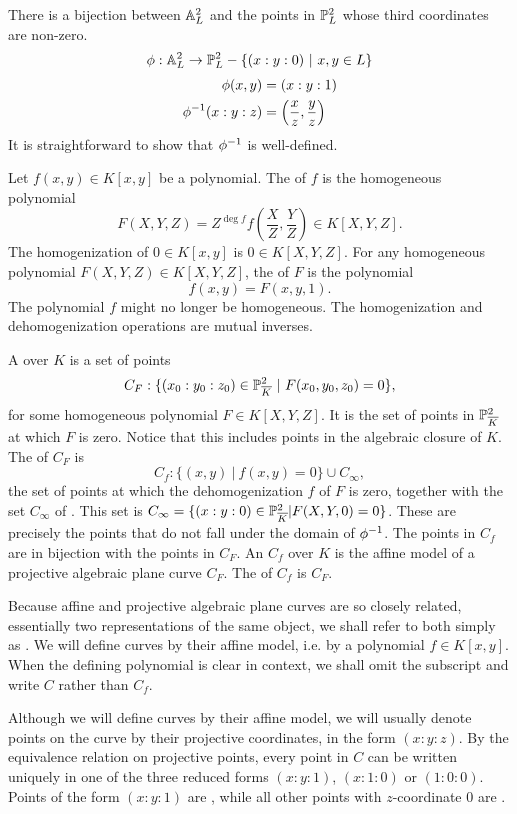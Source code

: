 There is a bijection between $\mathbb{A}_L^2$ and the points in $\mathbb{P}_L^2$ whose third coordinates are non-zero.
\[ \phi : \mathbb{A}_L^2 \to \mathbb{P}_L^2 - \{ (x:y:0) ~|~ x, y \in L \} \]
\begin{align*}
  \phi(x, y) &= (x : y : 1) \\
  \phi^{-1}(x : y : z) &= \left( \frac x z, \frac y z \right)
\end{align*}
It is straightforward to show that $\phi^{-1}$ is well-defined.

Let $f(x,y) \in K[x,y]$ be a polynomial.
The  of $f$ is the homogeneous polynomial
\[ F(X,Y,Z) = Z^{\deg f} f\left( \frac X Z, \frac Y Z \right) \in K[X,Y,Z]. \]
The homogenization of $0 \in K[x,y]$ is $0 \in K[X,Y,Z]$.
For any homogeneous polynomial $F(X,Y,Z) \in K[X,Y,Z]$,
the  of $F$ is the polynomial
\[ f(x,y) = F(x, y, 1). \]
The polynomial $f$ might no longer be homogeneous.
The homogenization and dehomogenization operations are mutual inverses.

A  over $K$ is a set of points
\[ C_F : \{ (x_0 : y_0 : z_0) \in \mathbb{P}_{\overline K}^2 ~|~ F(x_0, y_0, z_0) = 0 \}, \]
for some homogeneous polynomial $F \in K[X, Y, Z]$.
It is the set of points in $\mathbb{P}_{\overline K}^2$ at which $F$ is zero.
Notice that this includes points in the algebraic closure of $K$.
The  of $C_F$ is
\[ C_f : \{ (x, y) ~|~ f(x,y) = 0 \} \cup C_\infty, \]
the set of points at which the dehomogenization $f$ of $F$ is zero,
together with the set $C_\infty$ of .
This set is $C_\infty = \{ (x:y:0) \in \mathbb{P}_{\overline K}^2 | F(X,Y,0) = 0 \}$.
These are precisely the points that do not fall under the domain of $\phi^{-1}$.
The points in $C_f$ are in bijection with the points in $C_F$.
An  $C_f$ over $K$
is the affine model of a projective algebraic plane curve $C_F$.
The  of $C_f$ is $C_F$.

Because affine and projective algebraic plane curves are so closely related,
essentially two representations of the same object,
we shall refer to both simply as .
We will define curves by their affine model, i.e. by a polynomial $f \in K[x,y]$.
When the defining polynomial is clear in context, we shall omit the subscript and write $C$ rather than $C_f$.

Although we will define curves by their affine model,
we will usually denote points on the curve by their projective coordinates, in the form $(x:y:z)$.
By the equivalence relation on projective points,
every point in $C$ can be written uniquely in one of the three reduced forms $(x:y:1)$, $(x:1:0)$ or $(1:0:0)$.
Points of the form $(x:y:1)$ are ,
while all other points with $z$-coordinate 0 are .


